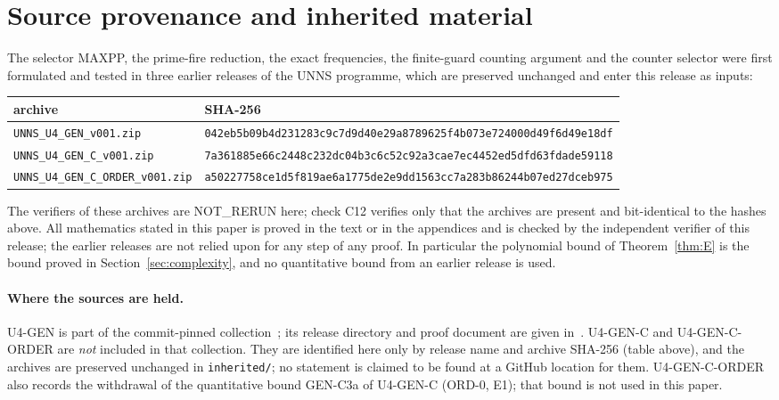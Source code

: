\section{Source provenance and inherited material}\label{app:prov}
The selector \textsf{MAXPP}, the prime-fire reduction, the exact frequencies, the finite-guard counting argument and the counter selector were first formulated and tested in three earlier releases of the UNNS programme, which are preserved unchanged and enter this release as inputs:
\begin{center}\scriptsize
\begin{tabular}{@{}ll@{}}\toprule
archive & SHA-256\\\midrule
\texttt{UNNS\_U4\_GEN\_v001.zip} & \texttt{042eb5b09b4d231283c9c7d9d40e29a8789625f4b073e724000d49f6d49e18df}\\
\texttt{UNNS\_U4\_GEN\_C\_v001.zip} & \texttt{7a361885e66c2448c232dc04b3c6c52c92a3cae7ec4452ed5dfd63fdade59118}\\
\texttt{UNNS\_U4\_GEN\_C\_ORDER\_v001.zip} & \texttt{a50227758ce1d5f819ae6a1775de2e9dd1563cc7a283b86244b07ed27dceb975}\\
\bottomrule\end{tabular}\end{center}
The verifiers of these archives are \textsc{NOT\_RERUN} here; check C12 verifies only that the archives are present and bit-identical to the hashes above. All mathematics stated in this paper is proved in the text or in the appendices and is checked by the independent verifier of this release; the earlier releases are not relied upon for any step of any proof. In particular the polynomial bound of Theorem~\ref{thm:E} is the bound proved in Section~\ref{sec:complexity}, and no quantitative bound from an earlier release is used.

\paragraph{Where the sources are held.} \textsf{U4-GEN} is part of the commit-pinned collection~\cite{coll}; its release directory and proof document are given in~\cite{u4gen}. \textsf{U4-GEN-C} and \textsf{U4-GEN-C-ORDER} are \emph{not} included in that collection. They are identified here only by release name and archive SHA-256 (table above), and the archives are preserved unchanged in \texttt{inherited/}; no statement is claimed to be found at a GitHub location for them. \textsf{U4-GEN-C-ORDER} also records the withdrawal of the quantitative bound GEN-C3a of \textsf{U4-GEN-C} (ORD-0, E1); that bound is not used in this paper.

